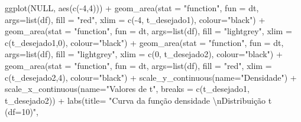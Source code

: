 \documentclass[
]{book}
\newenvironment{Shaded}{\begin{snugshade}}{\end{snugshade}}
\newcommand{\AttributeTok}[1]{\textcolor[rgb]{0.77,0.63,0.00}{#1}}
\newcommand{\ConstantTok}[1]{\textcolor[rgb]{0.00,0.00,0.00}{#1}}
\newcommand{\DecValTok}[1]{\textcolor[rgb]{0.00,0.00,0.81}{#1}}
\newcommand{\FunctionTok}[1]{\textcolor[rgb]{0.00,0.00,0.00}{#1}}
\newcommand{\NormalTok}[1]{#1}
\newcommand{\SpecialCharTok}[1]{\textcolor[rgb]{0.00,0.00,0.00}{#1}}
\newcommand{\StringTok}[1]{\textcolor[rgb]{0.31,0.60,0.02}{#1}}
\begin{document}
\begin{Shaded}
\begin{Highlighting}[]
\FunctionTok{ggplot}\NormalTok{(}\ConstantTok{NULL}\NormalTok{, }\FunctionTok{aes}\NormalTok{(}\FunctionTok{c}\NormalTok{(}\SpecialCharTok{{-}}\DecValTok{4}\NormalTok{,}\DecValTok{4}\NormalTok{))) }\SpecialCharTok{+}
  \FunctionTok{geom\_area}\NormalTok{(}\AttributeTok{stat =} \StringTok{"function"}\NormalTok{, }
            \AttributeTok{fun =}\NormalTok{ dt,}
            \AttributeTok{args=}\FunctionTok{list}\NormalTok{(df), }
            \AttributeTok{fill =} \StringTok{"red"}\NormalTok{, }
            \AttributeTok{xlim =} \FunctionTok{c}\NormalTok{(}\SpecialCharTok{{-}}\DecValTok{4}\NormalTok{, t\_desejado1),}
            \AttributeTok{colour=}\StringTok{"black"}\NormalTok{) }\SpecialCharTok{+}
  \FunctionTok{geom\_area}\NormalTok{(}\AttributeTok{stat =} \StringTok{"function"}\NormalTok{, }
            \AttributeTok{fun =}\NormalTok{ dt, }
            \AttributeTok{args=}\FunctionTok{list}\NormalTok{(df), }
            \AttributeTok{fill =} \StringTok{"lightgrey"}\NormalTok{, }
            \AttributeTok{xlim =} \FunctionTok{c}\NormalTok{(t\_desejado1,}\DecValTok{0}\NormalTok{),}
            \AttributeTok{colour=}\StringTok{"black"}\NormalTok{) }\SpecialCharTok{+}
  \FunctionTok{geom\_area}\NormalTok{(}\AttributeTok{stat =} \StringTok{"function"}\NormalTok{, }
            \AttributeTok{fun =}\NormalTok{ dt, }
            \AttributeTok{args=}\FunctionTok{list}\NormalTok{(df), }
            \AttributeTok{fill =} \StringTok{"lightgrey"}\NormalTok{, }
            \AttributeTok{xlim =} \FunctionTok{c}\NormalTok{(}\DecValTok{0}\NormalTok{, t\_desejado2),}
            \AttributeTok{colour=}\StringTok{"black"}\NormalTok{) }\SpecialCharTok{+}
  \FunctionTok{geom\_area}\NormalTok{(}\AttributeTok{stat =} \StringTok{"function"}\NormalTok{, }
            \AttributeTok{fun =}\NormalTok{ dt, }
            \AttributeTok{args=}\FunctionTok{list}\NormalTok{(df), }
            \AttributeTok{fill =} \StringTok{"red"}\NormalTok{, }
            \AttributeTok{xlim =} \FunctionTok{c}\NormalTok{(t\_desejado2,}\DecValTok{4}\NormalTok{),}
            \AttributeTok{colour=}\StringTok{"black"}\NormalTok{) }\SpecialCharTok{+}
  \FunctionTok{scale\_y\_continuous}\NormalTok{(}\AttributeTok{name=}\StringTok{"Densidade"}\NormalTok{) }\SpecialCharTok{+}
  \FunctionTok{scale\_x\_continuous}\NormalTok{(}\AttributeTok{name=}\StringTok{"Valores de t"}\NormalTok{, }\AttributeTok{breaks =} \FunctionTok{c}\NormalTok{(t\_desejado1, t\_desejado2))  }\SpecialCharTok{+}
  \FunctionTok{labs}\NormalTok{(}\AttributeTok{title=} \StringTok{"Curva da função densidade }\SpecialCharTok{\textbackslash{}n}\StringTok{Distribuição t (df=10)"}\NormalTok{, }

\end{Highlighting}
\end{Shaded}
\end{document}
